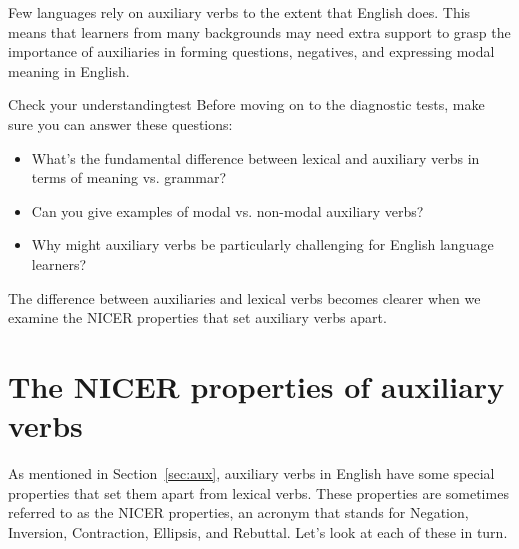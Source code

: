 Few languages rely on auxiliary verbs to the extent that English does. This means that learners from many backgrounds may need extra support to grasp the importance of auxiliaries in forming questions, negatives, and expressing modal meaning in English.

\begin{tblsframedsymbol}{Check your understanding}{test}
Before moving on to the diagnostic tests, make sure you can answer these questions:
\begin{itemize}[noitemsep, leftmargin=*]
    \item What's the fundamental difference between lexical and auxiliary verbs in terms of meaning vs. grammar?
    \item Can you give examples of modal vs. non-modal auxiliary verbs?
    \item Why might auxiliary verbs be particularly challenging for English language learners?
\end{itemize}
\end{tblsframedsymbol}

The difference between auxiliaries and lexical verbs becomes clearer when we examine the NICER properties that set auxiliary verbs apart.

\section{The NICER properties of auxiliary verbs}\label{sec:NICER}

As mentioned in Section~\ref{sec:aux}, auxiliary verbs in English have some special properties that set them apart from lexical verbs. These properties are sometimes referred to as the NICER properties, an acronym that stands for Negation, Inversion, Contraction, Ellipsis, and Rebuttal. Let's look at each of these in turn.


